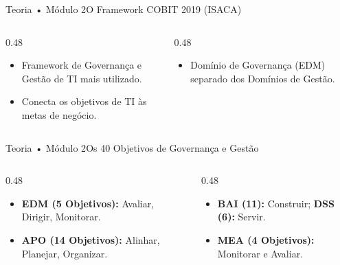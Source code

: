 \begin{senaiframe}{Teoria • Módulo 2}{O Framework COBIT 2019 (ISACA)}
  \begin{columns}[t]
    \begin{column}{0.48\textwidth}
      \begin{tcolorbox}[senairedcard, title={Visão Geral}]
        \begin{itemize}
          \item Framework de Governança e Gestão de TI mais utilizado.
          \item Conecta os objetivos de TI às metas de negócio.
        \end{itemize}
      \end{tcolorbox}
    \end{column}
    \begin{column}{0.48\textwidth}
      \begin{tcolorbox}[senaicard, title={Distinção Clave}]
        \begin{itemize}
          \item Domínio de Governança (EDM) separado dos Domínios de Gestão.
        \end{itemize}
      \end{tcolorbox}
    \end{column}
  \end{columns}
\end{senaiframe}

\begin{senaiframe}{Teoria • Módulo 2}{Os 40 Objetivos de Governança e Gestão}
  \begin{columns}[t]
    \begin{column}{0.48\textwidth}
      \begin{tcolorbox}[senaibluecard, title={Governança \& Planejamento}]
        \begin{itemize}
          \item \textbf{EDM (5 Objetivos):} Avaliar, Dirigir, Monitorar.
          \item \textbf{APO (14 Objetivos):} Alinhar, Planejar, Organizar.
        \end{itemize}
      \end{tcolorbox}
    \end{column}
    \begin{column}{0.48\textwidth}
      \begin{tcolorbox}[senaiambercard, title={Execução, Serviços \& Avaliação}]
        \begin{itemize}
          \item \textbf{BAI (11):} Construir; \textbf{DSS (6):} Servir.
          \item \textbf{MEA (4 Objetivos):} Monitorar e Avaliar.
        \end{itemize}
      \end{tcolorbox}
    \end{column}
  \end{columns}
\end{senaiframe}

